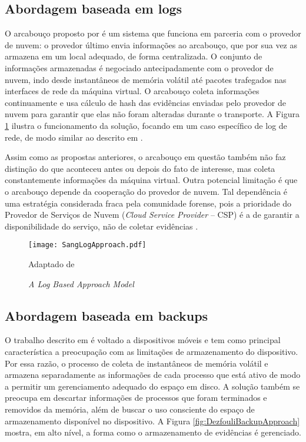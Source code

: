 \subsection{Abordagem baseada em logs}
\label{sec:modelologs}

O arcabouço proposto por \cite{SangLogApproach:2013} é um sistema que funciona em parceria com o provedor de nuvem: o provedor último envia informações ao arcabouço, que por sua vez as armazena em um local adequado, de forma centralizada.
%
O conjunto de informações armazenadas é negociado antecipadamente com o provedor de nuvem, indo desde instantâneos de memória volátil até pacotes trafegados nas interfaces de rede da máquina virtual.
%
O arcabouço coleta informações continuamente e usa cálculo de hash das evidências enviadas pelo provedor de nuvem para garantir que elas não foram alteradas durante o transporte.
%
A Figura \ref{fig:SangLogApproach} ilustra o funcionamento da solução, focando em um caso específico de log de rede, de modo similar ao descrito em \cite{SangLogApproach:2013}.


Assim como as propostas anteriores, o arcabouço em questão também não faz distinção do que aconteceu antes ou depois do fato de interesse, mas  coleta constantemente informações da máquina virtual.
%
Outra potencial limitação é que o arcabouço depende da cooperação do provedor de nuvem. 
%
Tal dependência é uma estratégia considerada fraca pela comunidade forense, pois a prioridade do Provedor de Serviços de Nuvem (\textit{Cloud Service Provider} -- CSP) é a de garantir a disponibilidade do serviço, não de coletar evidências \cite{ClarkeReviewOfChallenges2015}.
%

\begin{figure}[htb!]
\footnotesize
\caption{\textit{A Log Based Approach Model}}
\texttt{[image: SangLogApproach.pdf]}
\centering
\label{fig:SangLogApproach}
\begin{center}
Adaptado de \cite{SangLogApproach:2013} 
\end{center}
\end{figure}


\subsection{Abordagem baseada em backups}
\label{sec:modelobackup}

O trabalho descrito em \cite{DezfouliBackupApproach:2012} é voltado a dispositivos móveis e tem como principal característica a preocupação com as limitações de armazenamento do dispositivo.
%
Por essa razão, o processo de coleta de instantâneos de memória volátil e armazena separadamente as informações de cada processo que está ativo de modo a permitir um gerenciamento adequado do espaço em disco. 
%
A solução também se preocupa em descartar informações de processos que foram terminados e removidos da memória, além de buscar o uso consciente do espaço de armazenamento disponível no dispositivo.
%
A Figura \ref{fig:DezfouliBackupApproach} mostra, em alto nível, a forma como o armazenamento de evidências é gerenciado.

